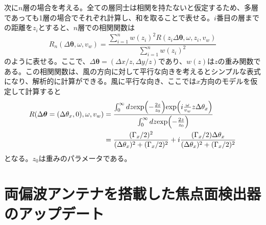 次に$n$層の場合を考える。全ての層同士は相関を持たないと仮定するため、多層であっても1層の場合でそれぞれ計算し、和を取ることで表せる。$i$番目の層までの距離を$z_{i}$とすると、$n$層での相関関数は
\begin{equation}
  R_{n}(\Delta\bm{\theta},\omega,v_{w}) = \frac{\displaystyle\sum_{i=1}^{n}w(z_{i})^{2}R(z_{i}\Delta\bm{\theta},\omega,z_{i},v_{w})}{\displaystyle\sum_{i=1}^{n}w(z_{i})^{2}}
\end{equation}
のように表せる。ここで、$\Delta\bm{\theta} = (\Delta x/z, \Delta y/z)$であり、$w(z)$は$z$の重み関数である。この相関関数は、風の方向に対して平行な向きを考えるとシンプルな表式になり、解析的に計算ができる。風に平行な向き、ここでは$x$方向のモデルを仮定して計算すると
\begin{align}
  R(\Delta\bm{\theta} = (\Delta\theta_{x}, 0), \omega, v_{w}) &= \frac{\int_{0}^{\infty}dz\mathrm{exp}\Bigl(-\frac{2z}{z_{0}}\Bigr)\mathrm{exp}\Bigl(i\frac{\omega}{v_{w}}z\Delta\theta_{x}\Bigr)}{\int_{0}^{\infty}dz\mathrm{exp}\Bigl(-\frac{2z}{z_{0}}\Bigr)} \\
  &= \frac{(\Gamma_{x}/2)^{2}}{(\Delta\theta_{x})^{2} + (\Gamma_{x}/2)^{2}} + i\frac{(\Gamma_{x}/2)\Delta\theta_{x}}{(\Delta\theta_{x})^{2} + (\Gamma_{x}/2)^{2}}
\end{align}
となる。$z_{0}$は重みのパラメータである。
\section{両偏波アンテナを搭載した焦点面検出器のアップデート}



